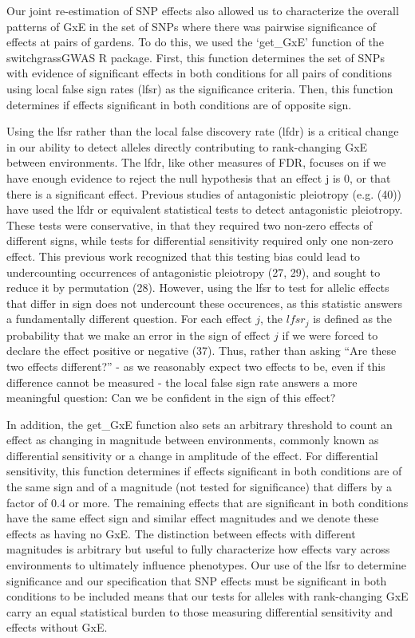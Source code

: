 \documentclass[
  9pt,
  twocolumn,
  twoside]{pnas-new}
\begin{document}
Our joint re-estimation of SNP effects also allowed us to characterize
the overall patterns of GxE in the set of SNPs where there was pairwise
significance of effects at pairs of gardens. To do this, we used the
`get\_GxE' function of the switchgrassGWAS R package. First, this
function determines the set of SNPs with evidence of significant effects
in both conditions for all pairs of conditions using local false sign
rates (lfsr) as the significance criteria. Then, this function
determines if effects significant in both conditions are of opposite
sign.

Using the lfsr rather than the local false discovery rate (lfdr) is a
critical change in our ability to detect alleles directly contributing
to rank-changing GxE between environments. The lfdr, like other measures
of FDR, focuses on if we have enough evidence to reject the null
hypothesis that an effect j is 0, or that there is a significant effect.
Previous studies of antagonistic pleiotropy (e.g. (40)) have used the
lfdr or equivalent statistical tests to detect antagonistic pleiotropy.
These tests were conservative, in that they required two non-zero
effects of different signs, while tests for differential sensitivity
required only one non-zero effect. This previous work recognized that
this testing bias could lead to undercounting occurrences of
antagonistic pleiotropy (27, 29), and sought to reduce it by permutation
(28). However, using the lfsr to test for allelic effects that differ in
sign does not undercount these occurences, as this statistic answers a
fundamentally different question. For each effect \(j\), the \(lfsr_j\)
is defined as the probability that we make an error in the sign of
effect \(j\) if we were forced to declare the effect positive or
negative (37). Thus, rather than asking ``Are these two effects
different?'' - as we reasonably expect two effects to be, even if this
difference cannot be measured - the local false sign rate answers a more
meaningful question: Can we be confident in the sign of this effect?

In addition, the get\_GxE function also sets an arbitrary threshold to
count an effect as changing in magnitude between environments, commonly
known as differential sensitivity or a change in amplitude of the
effect. For differential sensitivity, this function determines if
effects significant in both conditions are of the same sign and of a
magnitude (not tested for significance) that differs by a factor of 0.4
or more. The remaining effects that are significant in both conditions
have the same effect sign and similar effect magnitudes and we denote
these effects as having no GxE. The distinction between effects with
different magnitudes is arbitrary but useful to fully characterize how
effects vary across environments to ultimately influence phenotypes. Our
use of the lfsr to determine significance and our specification that SNP
effects must be significant in both conditions to be included means that
our tests for alleles with rank-changing GxE carry an equal statistical
burden to those measuring differential sensitivity and effects without
GxE.
\end{document}
